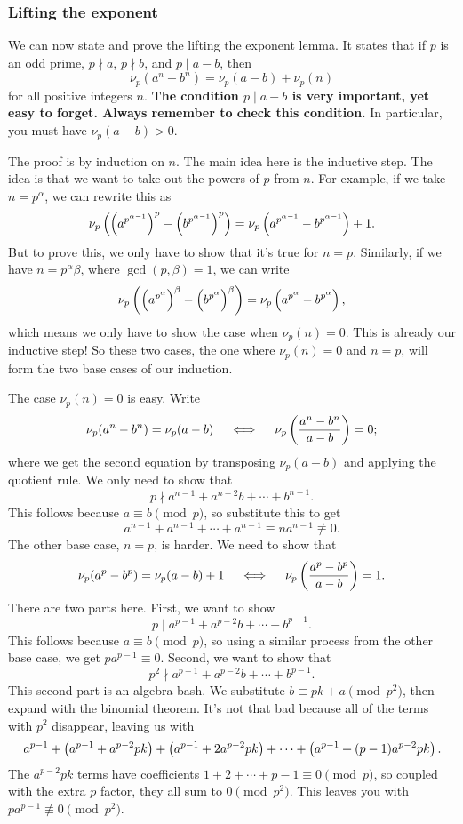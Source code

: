 \documentclass[11pt,paper=letter]{scrartcl}
\begin{document}
\subsubsection*{Lifting the exponent}

We can now state and prove the lifting the exponent lemma. It states that if $p$ is an odd prime, $p \nmid a$, $p \nmid b$, and $p \mid a - b$, then
$$\nu_p(a^n - b^n) = \nu_p(a - b) + \nu_p(n)$$
for all positive integers $n$. \textbf{The condition $p \mid a - b$ is very important, yet easy to forget. Always remember to check this condition.} In particular, you must have $\nu_p(a - b) > 0$.

The proof is by induction on $n$. The main idea here is the inductive step. The idea is that we want to take out the powers of $p$ from $n$. For example, if we take $n = p^{\alpha}$, we can rewrite this as
$$\nu_p\left(  \left( a^{p^{\alpha-1}} \right)^p - \left( b^{p^{\alpha-1}} \right)^p  \right) = \nu_p\left( a^{p^{\alpha-1}} - b^{p^{\alpha-1}} \right) + 1.$$
But to prove this, we only have to show that it's true for $n = p$. Similarly, if we have $n = p^{\alpha}\beta$, where $\gcd(p, \beta) = 1$, we can write
$$\nu_p\left( \left( a^{p^{\alpha}} \right)^\beta - \left( b^{p^{\alpha}} \right)^\beta \right) = \nu_p\left( a^{p^\alpha} - b^{p^\alpha} \right),$$
which means we only have to show the case when $\nu_p(n) = 0$. This is already our inductive step! So these two cases, the one where $\nu_p(n) = 0$ and $n = p$, will form the two base cases of our induction.

The case $\nu_p(n) = 0$ is easy. Write
$$\nu_p(a^n - b^n) = \nu_p(a - b) \quad \iff \quad \nu_p\left( \frac{a^n - b^n}{a - b} \right) = 0;$$
where we get the second equation by transposing $\nu_p(a - b)$ and applying the quotient rule. We only need to show that 
$$p \nmid a^{n-1} + a^{n-2}b + \cdots + b^{n-1}.$$
This follows because $a \equiv b \pmod p$, so substitute this to get $$a^{n-1} + a^{n-1} + \cdots + a^{n-1} \equiv n a^{n-1} \not\equiv 0.$$
The other base case, $n = p$, is harder. We need to show that
$$\nu_p(a^p - b^p) = \nu_p(a - b) + 1 \quad \iff \quad \nu_p\left( \frac{a^p - b^p}{a - b} \right) = 1.$$
There are two parts here. First, we want to show
$$p \mid a^{p-1} + a^{p-2}b + \cdots + b^{p-1}.$$
This follows because $a \equiv b \pmod p$, so using a similar process from the other base case, we get $pa^{p-1} \equiv 0$. Second, we want to show that
$$p^2 \nmid a^{p-1} + a^{p-2}b + \cdots + b^{p-1}.$$
This second part is an algebra bash. We substitute $b \equiv pk + a \pmod{p^2}$, then expand with the binomial theorem. It's not that bad because all of the terms with $p^2$ disappear, leaving us with
$$a^{p-1} + \left( a^{p-1} + a^{p-2}pk \right) + \left( a^{p-1} + 2a^{p-2}pk \right) + \cdots + \left( a^{p-1} + (p-1)a^{p-2}pk \right).$$
The $a^{p-2}pk$ terms have coefficients $1 + 2 + \cdots + p-1 \equiv 0 \pmod p$, so coupled with the extra $p$ factor, they all sum to $0 \pmod p^2$. This leaves you with $pa^{p-1} \not\equiv 0 \pmod{p^2}$.
\end{document}
